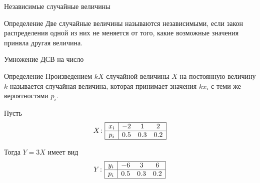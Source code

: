 \documentclass[unicode,11pt,notheorems,xcolor=table]{beamer}
\begin{document}
\begin{frame}{Независимые случайные величины}{}

    \begin{block}{Определение}
        Две случайные величины называются \alert{независимыми}, если закон распределения одной из них не меняется от того, какие возможные значения приняла другая величина.
    \end{block}


    
   
\end{frame}
\begin{frame}{Умножение ДСВ на число}{}
    
    
     \begin{block}{Определение}
        \alert{Произведением $kX$ случайной величины $X$ на постоянную величину $k$} называется случайная величина, которая принимает значения $kx_i$ с теми же вероятностями $p_i$.
     \end{block}

     \bigskip

     \medskip

     Пусть 
     $$
     X\colon \begin{array}{|c|ccc|}
        \hline
         x_i & -2 & 1& 2 \\
         \hline
         p_i & 0.5 & 0.3 & 0.2 \\
         \hline
        \end{array}
     $$
    
    Тогда $Y=3X$ имеет вид
    $$
   Y\colon \begin{array}{|c|ccc|}
       \hline
        y_i & -6 & 3& 6 \\
        \hline
        p_i & 0.5 & 0.3 & 0.2 \\
        \hline
       \end{array}
    $$
   
\end{frame}
\end{document}
